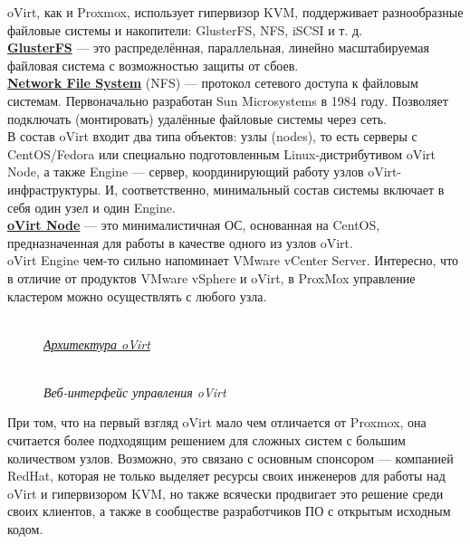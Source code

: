 \documentclass[14pt, a4paper]{article}
\begin{document}
oVirt, как и Proxmox, использует гипервизор KVM, поддерживает разнообразные файловые системы и
накопители: GlusterFS, NFS, iSCSI и т. д.\\

\href{https://ru.wikipedia.org/wiki/GlusterFS}{\textbf{GlusterFS}} — это распределённая, параллельная, линейно масштабируемая файловая система с
возможностью защиты от сбоев.\\

\href{https://ru.wikipedia.org/wiki/Network_File_System}{\textbf{Network File System}} (NFS) — протокол сетевого доступа к файловым системам. Первоначально
разработан Sun Microsystems в 1984 году. Позволяет подключать (монтировать) удалённые файловые
системы через сеть.\\

В состав oVirt входит два типа объектов: узлы (nodes), то есть серверы с CentOS/Fedora или
специально подготовленным Linux-дистрибутивом oVirt Node, а также Engine — сервер,
координирующий работу узлов oVirt-инфраструктуры. И, соответственно, минимальный состав
системы включает в себя один узел и один Engine.\\

\href{https://www.ovirt.org/download/node.html}{\textbf{oVirt Node}} — это минималистичная ОС, основанная на CentOS, предназначенная для работы в
качестве одного из узлов oVirt.\\

oVirt Engine чем-то сильно напоминает VMware vCenter Server. Интересно, что в отличие от продуктов
VMware vSphere и oVirt, в ProxMox управление кластером можно осуществлять с любого узла.

\newpage

\begin{figure}[h]
    \centering
    \\ 
    \small\textit{\href{https://www.ovirt.org/develop/architecture/architecture.html}{Архитектура oVirt}}  
    \label{framework} 
\end{figure}

\begin{figure}[h]
    \centering
    \\ 
    \small\textit{Веб-интерфейс управления oVirt}  
    \label{framework} 
\end{figure}

При том, что на первый взгляд oVirt мало чем отличается от Proxmox, она считается более
подходящим решением для сложных систем с большим количеством узлов. Возможно, это связано с
основным спонсором — компанией RedHat, которая не только выделяет ресурсы своих инженеров
для работы над oVirt и гипервизором KVM, но также всячески продвигает это решение среди своих
клиентов, а также в сообществе разработчиков ПО с открытым исходным кодом.\\
\end{document}

